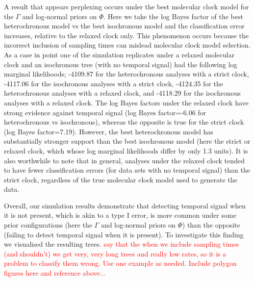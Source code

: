 \documentclass[10pt,letterpaper]{article}
\begin{document}
A result that appears perplexing occurs under the best molecular clock model for the $\Gamma$ and log-normal priors on $\Phi$. Here we take the log Bayes factor of the best heterochronous model vs the best isochronous model and the classification error increases, relative to the relaxed clock only. This phenomenon occurs because the incorrect inclusion of sampling times can mislead molecular clock model selection. As a case in point one of the simulation replicates under a relaxed molecular clock and an isochronous tree (with no temporal signal) had the following log marginal likelihoods; -4109.87 for the heterochronous analyses with a strict clock, -4117.06 for the isochronous analyses with a strict clock, -4124.35 for the heterochronous analyses with a relaxed clock, and -4118.29 for the isochronous analyses with a relaxed clock. The log Bayes factors under the relaxed clock have strong evidence against temporal signal (log Bayes factor=-6.06 for heterochronous vs isochronous), whereas the opposite is true for the strict clock (log Bayes factor=7.19). However, the best heterochronous model has substantially stronger support than the best isochronous model (here the strict or relaxed clock, which whose log marginal likelihoods differ by only 1.3 units). It is also worthwhile to note that in general, analyses under the relaxed clock tended to have fewer classification errors (for data sets with no temporal signal) than the strict clock, regardless of the true molecular clock model used to generate the data.

Overall, our simulation results demonstrate that detecting temporal signal when it is not present, which is akin to a type I error, is more common under some prior configurations (here the $\Gamma$ and log-normal priors on $\Phi$) than the opposite (failing to detect temporal signal when it is present). To investigate this finding we visualised the resulting trees. 
\textcolor{red}{say that the when we include sampling times (and shouldn't) we get very, very long trees and really low rates, so it is a problem to classify them wrong. Use one example as needed. Include polygon figures here and reference above...}
\end{document}
